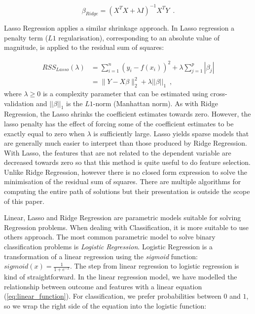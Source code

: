 \begin{equation}
    \beta_{Ridge} = (X^TX + \lambda I)^{-1}X^TY
    \enspace.
\end{equation}

Lasso Regression applies a similar shrinkage approach. In Lasso regression a penalty term ($L1$ regularisation), corresponding to an absolute value of magnitude, is applied to the residual sum of squares:

\begin{equation}
\begin{aligned}
 RSS_{Lasso}(\lambda) & = \sum_{i=1}^{n}(y_i -f(x_i))^2 + \lambda\sum_{j=1}^{p}|\beta_{j}| \\
& = \|Y - X\beta\|_2^2 + \lambda||\beta||_1
    \enspace,
\end{aligned}
\end{equation}
where $\lambda \geq 0 $ is a complexity parameter that can be estimated using cross-validation and $||\beta||_1$ is the $L1$-norm (Manhattan norm). As with Ridge Regression, the Lasso shrinks the coefficient estimates towards zero. However, the lasso penalty has the effect of forcing some of the coefficient estimates to be exactly equal to zero when $\lambda$ is sufficiently large. Lasso yields sparse models that are generally much easier to interpret than those produced by Ridge Regression. With Lasso, the features that are not related to the dependent variable are decreased towards zero so that this method is quite useful to do feature selection. Unlike Ridge Regression, however there is no closed form expression to solve the minimisation of the residual sum of squares. There are multiple algorithms for computing the entire path of solutions but their presentation is outside the scope of this paper. 

Linear, Lasso and Ridge Regression are parametric models suitable for solving Regression problems. When dealing with Classification, it is more suitable to use others approach. The most common parametric model to solve binary classification problems is \textit{Logistic Regression}. Logistic Regression is a transformation of a linear regression using the \textit{sigmoid} function: $sigmoid(x) = \frac{1}{1 + e^{-x}}$. The step from linear regression to logistic regression is kind of straightforward. In the linear regression model, we have modelled the relationship between outcome and features with a linear equation (\ref{eq:linear_function}). For classification, we prefer probabilities between $0$ and $1$, so we wrap the right side of the equation into the logistic function:

